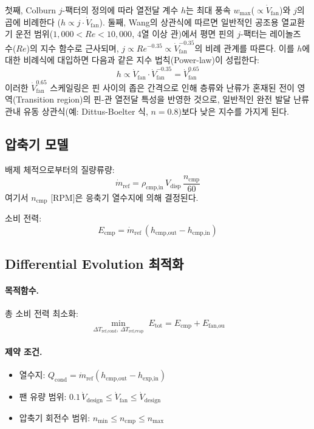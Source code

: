 첫째, Colburn $j$-팩터의 정의에 따라 열전달 계수 $h$는 최대 풍속 $w_\text{max}$($\propto \dot{V}_\text{fan}$)와 $j$의 곱에 비례한다 ($h \propto j \cdot \dot{V}_\text{fan}$). 둘째, Wang의 상관식에 따르면 일반적인 공조용 열교환기 운전 범위($1,000 < Re < 10,000$, 4열 이상 관)에서 평면 핀의 $j$-팩터는 레이놀즈 수($Re$)의 지수 함수로 근사되며, $j \propto Re^{-0.35} \propto \dot{V}_\text{fan}^{-0.35}$의 비례 관계를 따른다. 이를 $h$에 대한 비례식에 대입하면 다음과 같은 지수 법칙(Power-law)이 성립한다:
\begin{equation}\label{eq:ashp-h-scaling}
  h \propto \dot{V}_\text{fan} \cdot \dot{V}_\text{fan}^{-0.35} = \dot{V}_\text{fan}^{0.65}
\end{equation}
이러한 $\dot{V}_\text{fan}^{0.65}$ 스케일링은 핀 사이의 좁은 간격으로 인해 층류와 난류가 혼재된 전이 영역(Transition region)의 핀-관 열전달 특성을 반영한 것으로, 일반적인 완전 발달 난류 관내 유동 상관식(예: Dittus-Boelter 식, $n=0.8$)보다 낮은 지수를 가지게 된다.

\subsection{압축기 모델}

배제 체적으로부터의 질량류량:
\begin{equation}\label{eq:ashp-mdot}
  \dot{m}_\text{ref} = \rho_\text{cmp,in}\,V_\text{disp}\,\frac{n_\text{cmp}}{60}
\end{equation}
여기서 $n_\text{cmp}$ [RPM]은 응축기 열수지에 의해 결정된다.

소비 전력:
\begin{equation}\label{eq:ashp-Ecmp}
  E_\text{cmp} = \dot{m}_\text{ref}\,(h_\text{cmp,out} - h_\text{cmp,in})
\end{equation}

\subsection{Differential Evolution 최적화}

\paragraph{목적함수.}
총 소비 전력 최소화:
\begin{equation}\label{eq:ashp-obj}
  \min_{\Delta T_\text{ref,cond},\,\Delta T_\text{ref,evap}} \;
  E_\text{tot} = E_\text{cmp} + E_\text{fan,ou}
\end{equation}

\paragraph{제약 조건.}
\begin{itemize}
  \item 열수지: $Q_\text{cond} = \dot{m}_\text{ref}(h_\text{cmp,out} - h_\text{exp,in})$
  \item 팬 유량 범위: $0.1\,\dot{V}_\text{design} \le \dot{V}_\text{fan} \le \dot{V}_\text{design}$
  \item 압축기 회전수 범위: $n_\text{min} \le n_\text{cmp} \le n_\text{max}$
\end{itemize}

